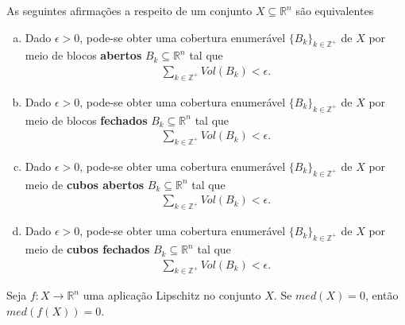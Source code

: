 \begin{theorem}
  As seguintes afirmações a respeito de um conjunto $X\subseteq\mathbb{R}^{n}$ são equivalentes
  \begin{enumerate}[a)]
    \item Dado $\epsilon>0$, pode-se obter uma cobertura enumerável $\{B_{k}\}_{k\in\mathbb{Z}^{+}}$ de $X$ por meio de blocos \textbf{abertos} $B_k\subseteq\mathbb{R}^{n}$ tal que
      \begin{align*}
        \sum_{k\in\mathbb{Z}^{+}}Vol(B_k)<\epsilon.
      \end{align*}
    \item Dado $\epsilon>0$, pode-se obter uma cobertura enumerável $\{B_{k}\}_{k\in\mathbb{Z}^{+}}$ de $X$ por meio de blocos \textbf{fechados} $B_k\subseteq\mathbb{R}^{n}$ tal que
      \begin{align*}
        \sum_{k\in\mathbb{Z}^{+}}Vol(B_k)<\epsilon.
      \end{align*}
    \item Dado $\epsilon>0$, pode-se obter uma cobertura enumerável $\{B_{k}\}_{k\in\mathbb{Z}^{+}}$ de $X$ por meio de \textbf{cubos abertos} $B_k\subseteq\mathbb{R}^{n}$ tal que
      \begin{align*}
        \sum_{k\in\mathbb{Z}^{+}}Vol(B_k)<\epsilon.
      \end{align*}
    \item Dado $\epsilon>0$, pode-se obter uma cobertura enumerável $\{B_{k}\}_{k\in\mathbb{Z}^{+}}$ de $X$ por meio de \textbf{cubos fechados} $B_k\subseteq\mathbb{R}^{n}$ tal que
      \begin{align*}
        \sum_{k\in\mathbb{Z}^{+}}Vol(B_k)<\epsilon.
      \end{align*}
  \end{enumerate}
\end{theorem}
\begin{theorem}
  Seja $f:X\to\mathbb{R}^{n}$ uma aplicação Lipschitz no conjunto $X$. Se $med(X)=0$, então $med(f(X))=0$. 
\end{theorem}
